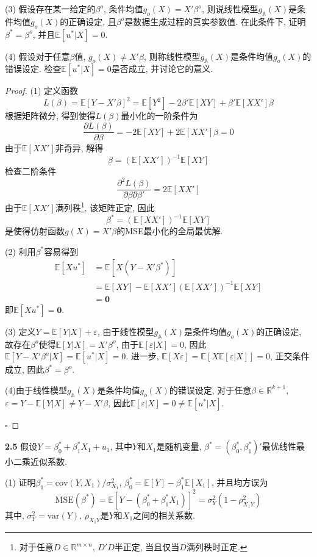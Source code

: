 \documentclass[cn,12pt,math=mtpro2,citestyle=gb7714-2015,bibstyle=gb7714-2015,twocol,mode=simple]{elegantbook}
\newcommand{\E}{\mathbb{E}}
\newcommand{\var}{\text{var}}
\begin{document}
(3) 假设存在某一给定的$\beta^o$, 条件均值$g_o(X)=X'\beta^o$, 则说线性模型$g_{\mathbb{A}}(X)$是条件均值$g_o(X)$的正确设定, 且$\beta^o$是数据生成过程的真实参数值. 在此条件下, 证明$\beta^{\ast}=\beta^o$, 并且$\E[u^{\ast}|X]=0$.

(4) 假设对于任意$\beta$值, $g_o(X)\neq X'\beta$, 则称线性模型$g_{\mathbb{A}}(X)$是条件均值$g_o(X)$的错误设定. 检查$\E[u^{\ast}|X]=0$是否成立, 并讨论它的意义.

\begin{proof}
  (1) 定义函数
  $$L(\beta)=\E[Y-X'\beta]^2=\E[Y^2]-2\beta'\E[XY]+\beta'\E[XX']\beta$$
  根据矩阵微分, 得到使得$L(\beta)$最小化的一阶条件为
  $$\frac{\partial L(\beta)}{\partial \beta}=-2\E[XY]+2\E[XX']\beta=0$$
  由于$\E[XX']$非奇异, 解得
  $$\beta=(\E[XX'])^{-1}\E[XY]$$
  检查二阶条件
  $$\frac{\partial^2 L(\beta)}{\partial \beta\partial\beta '}=2\E[XX']$$
  由于$\E[XX']$满列秩{\small \footnote{对于任意$D\in \mathbb{R}^{m \times n}$, $D'D$半正定, 当且仅当$D$满列秩时正定.}}, 该矩阵正定, 因此
  $$\beta^{\ast}=(\E[XX'])^{-1}\E[XY]$$
  是使得仿射函数$g(X)=X'\beta$的MSE最小化的全局最优解.

  (2) 利用$\beta^{\ast}$容易得到
  \begin{align}
  \E[Xu^{\ast}]&=\E[X(Y-X'\beta^{\ast})] \nonumber \\
  &=\E[XY]-\E[XX'](\E[XX'])^{-1}\E[XY] \nonumber \\
  &=\mathbf{0} \nonumber
  \end{align}
  即$\E[Xu^{\ast}]=\mathbf{0}$.

  (3) 定义$Y=\E[Y|X]+\varepsilon$, 由于线性模型$g_{\mathbb{A}}(X)$是条件均值$g_o(X)$的正确设定, 故存在$\beta^o$使得$\E[Y|X]=X'\beta^o$, 由于$\E[\varepsilon|X]=0$, 因此$\E[Y-X'\beta^o|X]=\E[u^{\ast}|X]=0$.  进一步, $\E[X\varepsilon]=\E[X\E[\varepsilon|X]]=0$, 正交条件成立, 因此$\beta^{\ast}=\beta^o$.

  (4)由于线性模型$g_{\mathbb{A}}(X)$是条件均值$g_o(X)$的错误设定, 对于任意$\beta \in \mathbb{R}^{k+1}$, $\varepsilon =Y- \E[Y|X] \neq Y-X'\beta$, 因此$\E[\varepsilon|X]=0\neq\E[u^{\ast}|X]$.

  $\square$
\end{proof}

\textbf{2.5} 假设$Y=\beta_0^{\ast}+\beta_1^{\ast}X_1+u_1$, 其中$Y$和$X_1$是随机变量, $\beta^{\ast}=(\beta_0^{\ast}, \beta_1^{\ast})'$最优线性最小二乘近似系数.

(1) 证明$\beta_1^{\ast}=\text{cov}(Y, X_1)/\sigma^2_{X_1}$, $\beta_0^{\ast}=\E[Y]-\beta_1^{\ast}\E[X_1]$, 并且均方误为
$$\text{MSE}(\beta^{\ast})=\E[Y-(\beta_0^{\ast}+\beta_1^{\ast}X_1)]^2=\sigma^2_Y(1-\rho^2_{X_1Y})$$
其中, $\sigma^2_Y=\var(Y)$, $\rho_{X_1Y}$是$Y$和$X_1$之间的相关系数.
\end{document}
